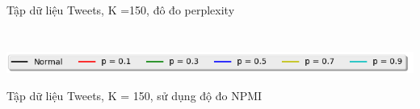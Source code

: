 \documentclass[pdf]{beamer}
\begin{document}
\begin{frame}{Tập dữ liệu Tweets, K =150, đô đo perplexity}
\begin{columns}[T]
\begin{column}{.50\textwidth}
\begin{figure}
\end{figure}				
\end{column} %
\end{columns}
\begin{center}
\includegraphics[width=1\textwidth]{menu.png}	
\end{center}
\end{frame}

\begin{frame}{Tập dữ liệu Tweets, K = 150, sử dụng độ đo NPMI }
\begin{columns}[T] %
\begin{column}{.50\textwidth}
\begin{figure}
\end{figure}
\end{column} %
\hfill%
\begin{column}{.50\textwidth}
\begin{figure}

\end{figure}
\end{column}
\end{columns}
\end{frame}
\end{document}
